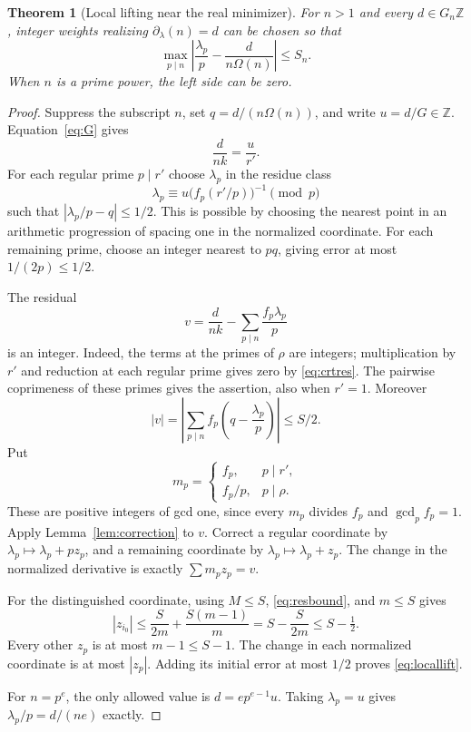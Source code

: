 \documentclass[11pt]{article}
\newtheorem{theorem}{Theorem}[section]
\theoremstyle{definition}
\theoremstyle{remark}
\newcommand{\Z}{\mathbb Z}
\newcommand{\Om}{\Omega}
\begin{document}
\begin{theorem}[Local lifting near the real minimizer]\label{thm:local}
For $n>1$ and every $d\in G_n\Z$, integer weights realizing $\partial_\lambda(n)=d$ can be chosen so that
\begin{equation}\label{eq:locallift}
 \max_{p\mid n}\left|\frac{\lambda_p}{p}-\frac{d}{n\Om(n)}\right|\le S_n.
\end{equation}
When $n$ is a prime power, the left side can be zero.
\end{theorem}
\begin{proof}
Suppress the subscript $n$, set $q=d/(n\Om(n))$, and write $u=d/G\in\Z$. Equation~\eqref{eq:G} gives
\[
 \frac{d}{nk}=\frac{u}{r'}.
\]
For each regular prime $p\mid r'$ choose $\lambda_p$ in the residue class
\begin{equation}\label{eq:crtres}
 \lambda_p\equiv u\bigl(f_p(r'/p)\bigr)^{-1}\pmod p
\end{equation}
such that $|\lambda_p/p-q|\le1/2$. This is possible by choosing the nearest point in an arithmetic progression of spacing one in the normalized coordinate. For each remaining prime, choose an integer nearest to $pq$, giving error at most $1/(2p)\le1/2$.

The residual
\[
 v=\frac{d}{nk}-\sum_{p\mid n}\frac{f_p\lambda_p}{p}
\]
is an integer. Indeed, the terms at the primes of $\rho$ are integers; multiplication by $r'$ and reduction at each regular prime gives zero by \eqref{eq:crtres}. The pairwise coprimeness of these primes gives the assertion, also when $r'=1$. Moreover
\begin{equation}\label{eq:resbound}
 |v|=\left|\sum_{p\mid n} f_p\left(q-\frac{\lambda_p}{p}\right)\right|\le S/2.
\end{equation}
Put
\[
 m_p=\begin{cases}f_p,&p\mid r',\\ f_p/p,&p\mid\rho.\end{cases}
\]
These are positive integers of gcd one, since every $m_p$ divides $f_p$ and $\gcd_p f_p=1$. Apply Lemma~\ref{lem:correction} to $v$. Correct a regular coordinate by $\lambda_p\mapsto\lambda_p+pz_p$, and a remaining coordinate by $\lambda_p\mapsto\lambda_p+z_p$. The change in the normalized derivative is exactly $\sum m_pz_p=v$.

For the distinguished coordinate, using $M\le S$, \eqref{eq:resbound}, and $m\le S$ gives
\[
 |z_{i_0}|\le\frac{S}{2m}+\frac{S(m-1)}m
 =S-\frac{S}{2m}\le S-\tfrac12.
\]
Every other $z_p$ is at most $m-1\le S-1$. The change in each normalized coordinate is at most $|z_p|$. Adding its initial error at most $1/2$ proves \eqref{eq:locallift}.

For $n=p^e$, the only allowed value is $d=ep^{e-1}u$. Taking $\lambda_p=u$ gives $\lambda_p/p=d/(ne)$ exactly.
\end{proof}
\end{document}
